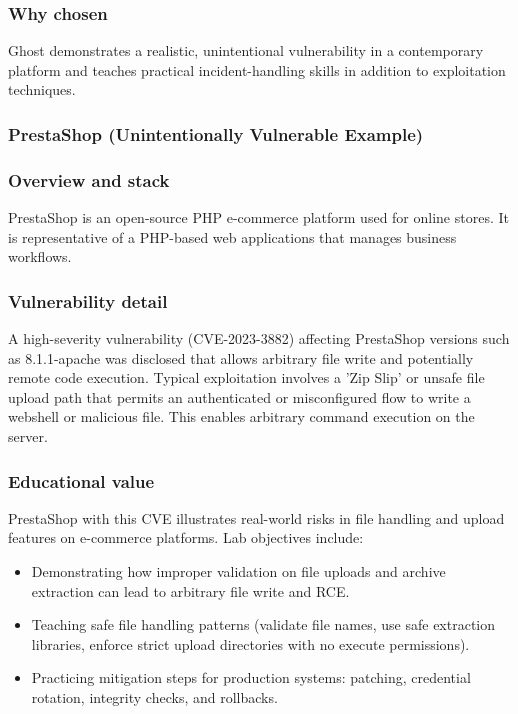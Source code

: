 \documentclass[12pt,titlepage]{article}
\begin{document}
\subsubsection*{Why chosen}
Ghost demonstrates a realistic, unintentional vulnerability in a contemporary platform and teaches practical incident-handling skills in addition to exploitation techniques.

\subsubsection{PrestaShop (Unintentionally Vulnerable Example)}

\subsubsection*{Overview and stack}
PrestaShop is an open-source PHP e-commerce platform used for online stores. It is representative of a PHP-based web applications that manages business workflows.

\subsubsection*{Vulnerability detail}	
A high-severity vulnerability (CVE-2023-3882) affecting PrestaShop versions such as 8.1.1-apache was disclosed that allows arbitrary file write and potentially remote code execution. Typical exploitation involves a 'Zip Slip' or unsafe file upload path that permits an authenticated or misconfigured flow to write a webshell or malicious file. This enables arbitrary command execution on the server.

\subsubsection*{Educational value}
PrestaShop with this CVE illustrates real-world risks in file handling and upload features on e-commerce platforms. Lab objectives include:
\begin{itemize}
    \item Demonstrating how improper validation on file uploads and archive extraction can lead to arbitrary file write and RCE.
    \item Teaching safe file handling patterns (validate file names, use safe extraction libraries, enforce strict upload directories with no execute permissions).
    \item Practicing mitigation steps for production systems: patching, credential rotation, integrity checks, and rollbacks.
\end{itemize}
\end{document}
